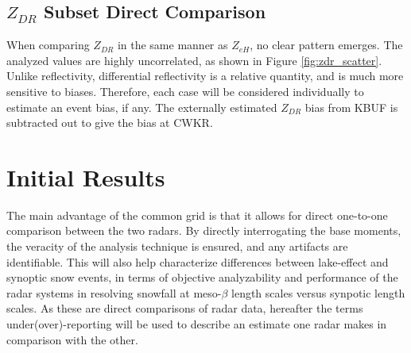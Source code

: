 \subsection{$Z_{DR}$ Subset Direct Comparison}
When comparing $Z_{DR}$ in the same manner as $Z_{eH}$, no clear pattern emerges. The analyzed values are highly uncorrelated, as shown in Figure \ref{fig:zdr_scatter}. Unlike reflectivity, differential reflectivity is a relative quantity, and is much more sensitive to biases. Therefore, each case will be considered individually to estimate an event bias, if any. The externally estimated $Z_{DR}$ bias from KBUF is subtracted out to give the bias at CWKR.


\section{Initial Results}
The main advantage of the common grid is that it allows for direct one-to-one comparison between the two radars. By directly interrogating the base moments, the veracity of the analysis technique is ensured, and any artifacts are identifiable. This will also help characterize differences between lake-effect and synoptic snow events, in terms of objective analyzability and performance of the radar systems in resolving snowfall at meso-$\beta$ length scales versus synpotic length scales. As these are direct comparisons of radar data, hereafter the terms under(over)-reporting will be used to describe an estimate one radar makes in comparison with the other.
